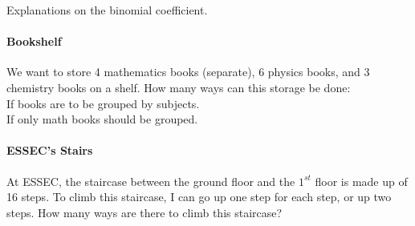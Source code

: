\documentclass[]{article}
\begin{document}
	Explanations on the binomial coefficient.
	
	\paragraph{Bookshelf}
	We want to store 4 mathematics books (separate), 6 physics books, and 3 chemistry books on a shelf.
	How many ways can this storage be done:\\
	If books are to be grouped by subjects.\\
	If only math books should be grouped.
	
	\paragraph{ESSEC's Stairs}
	At ESSEC, the staircase between the ground floor and the $1^{st}$ floor is made up of 16 steps.
	To climb this staircase, I can go up one step for each step, or up two steps. How many ways are there to climb this staircase?
	
	
	
	
\end{document}
